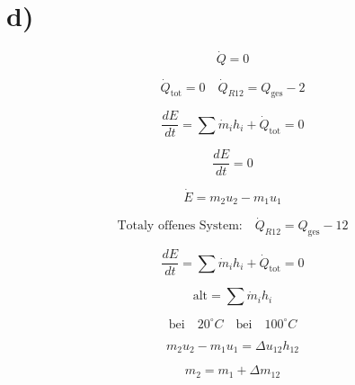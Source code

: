 

\section*{d)}

\[
\dot{Q} = 0
\]

\[
\dot{Q}_{\text{tot}} = 0 \quad \dot{Q}_{R12} = Q_{\text{ges}} - 2
\]

\[
\frac{dE}{dt} = \sum \dot{m}_i h_i + \dot{Q}_{\text{tot}} = 0
\]

\[
\frac{dE}{dt} = 0
\]

\[
\dot{E} = m_2 u_2 - m_1 u_1
\]

\[
\text{Totaly offenes System:} \quad \dot{Q}_{R12} = Q_{\text{ges}} - 12
\]

\[
\frac{dE}{dt} = \sum \dot{m}_i h_i + \dot{Q}_{\text{tot}} = 0
\]

\[
\text{alt} = \sum \dot{m}_i h_i
\]

\[
\text{bei} \quad 20^\circ C \quad \text{bei} \quad 100^\circ C
\]

\[
m_2 u_2 - m_1 u_1 = \Delta u_{12} h_{12}
\]

\[
m_2 = m_1 + \Delta m_{12}
\]